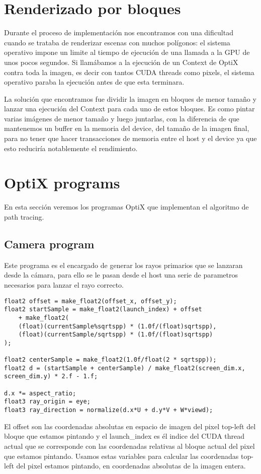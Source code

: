 \section{Renderizado por bloques}

Durante el proceso de implementación nos encontramos con una dificultad cuando se trataba de renderizar escenas con muchos polígonos: el sistema operativo impone un limite al tiempo de ejecución de una llamada a la GPU de unos pocos segundos. Si llamábamos a la ejecución de un Context de OptiX contra toda la imagen, es decir con tantos CUDA threads como pixels, el sistema operativo paraba la ejecución antes de que esta terminara.

\medskip

La solución que encontramos fue dividir la imagen en bloques de menor tamaño y lanzar una ejecución del Context para cada uno de estos bloques. Es como pintar varias imágenes de menor tamaño y luego juntarlas, con la diferencia de que mantenemos un buffer en la memoria del device, del tamaño de la imagen final, para no tener que hacer transacciones de memoria entre el host y el device ya que esto reduciría notablemente el rendimiento.

\clearpage

\section{OptiX programs}

En esta sección veremos los programas OptiX que implementan el algoritmo de path tracing.

\subsection{Camera program}

Este programa es el encargado de generar los rayos primarios que se lanzaran desde la cámara, para ello se le pasan desde el host una serie de parametros necesarios para lanzar el rayo correcto.

\begin{lstlisting}
float2 offset = make_float2(offset_x, offset_y);
float2 startSample = make_float2(launch_index) + offset 
	+ make_float2(
	(float)(currentSample%sqrtspp) * (1.0f/(float)sqrtspp),
	(float)(currentSample/sqrtspp) * (1.0f/(float)sqrtspp)
);

float2 centerSample = make_float2(1.0f/float(2 * sqrtspp));
float2 d = (startSample + centerSample) / make_float2(screen_dim.x, screen_dim.y) * 2.f - 1.f;

d.x *= aspect_ratio;
float3 ray_origin = eye;
float3 ray_direction = normalize(d.x*U + d.y*V + W*viewd);
\end{lstlisting}
El offset son las coordenadas absolutas en espacio de imagen del pixel top-left del bloque que estamos pintando y el launch\_index es él indice del CUDA thread actual que se corresponde con las coordenadas relativas al bloque actual del pixel que estamos pintando. Usamos estas variables para calcular las coordenadas top-left del pixel estamos pintando, en coordenadas absolutas de la imagen entera.

